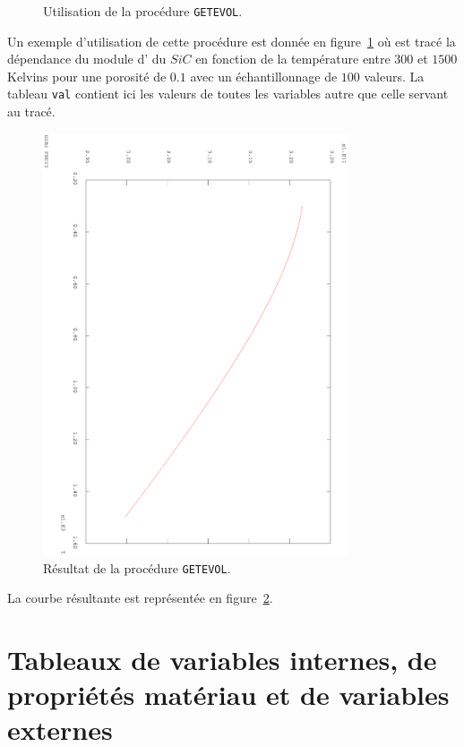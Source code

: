 \documentclass[12pt]{article}
\newcommand{\sic}{$SiC$}
\newcommand{\code}[1]{
  \psframebox[linecolor=ceaorange,shadow=true,blur=true]{
    \begin{minipage}[htbp]{1.0\linewidth}
      \ttfamily\scriptsize #1
    \end{minipage}
  }
}
\begin{document}
\begin{figure}[htbp]
  \centering
  \code{
    
  }
  \caption{Utilisation de la procédure \texttt{GETEVOL}.}
  \label{fig:TestGetEvol}
\end{figure}

Un exemple d'utilisation de cette procédure est donnée en
figure~\ref{fig:TestGetEvol} où est tracé la dépendance du module
d' du \sic{} en fonction de la température entre $300$ et
$1500$ Kelvins pour une porosité de $0.1$ avec un échantillonnage de
$100$ valeurs. La tableau \texttt{val} contient ici les valeurs de
toutes les variables autre que celle servant au tracé.

\begin{figure}[htbp]
  \centering
  \includegraphics[width=9cm,angle=90]{mfront/GetEvol.eps}
  \caption{Résultat de la procédure \texttt{GETEVOL}.}
  \label{fig:TestGetEvol2}
\end{figure}

La courbe résultante est représentée en figure~\ref{fig:TestGetEvol2}.

\clearpage
\newpage
\section{Tableaux de variables internes, de propriétés matériau et de
  variables externes}
\end{document}
